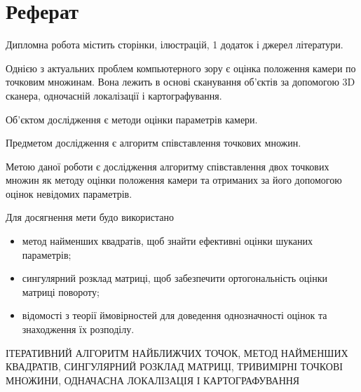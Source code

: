\chapter*{Реферат}

Дипломна робота містить \pageref{LastPage} сторінки,
 ілюстрацій, 1 додаток і
 джерел літератури.

Однією з актуальних проблем компьютерного зору є оцінка положення камери по
точковим множинам.
Вона лежить в основі сканування об'єктів за допомогою 3D сканера,
одночасній локалізації і картографування.

Об'єктом дослідження є методи оцінки параметрів камери.

Предметом дослідження є алгоритм співставлення точкових множин.

Метою даної роботи є дослідження алгоритму співставлення
двох точкових множин як методу оцінки положення камери та отриманих за його
допомогою оцінок невідомих параметрів.

Для досягнення мети будо використано
\begin{itemize}
  \item метод найменших квадратів, щоб знайти ефективні оцінки шуканих
  параметрів;
  \item сингулярний розклад матриці, щоб забезпечити ортогональність оцінки
  матриці повороту;
  \item відомості з теорії ймовірностей для доведення однозначності оцінок та
  знаходження їх розподілу.
\end{itemize}

\MakeUppercase{ітеративний алгоритм найближчих точок, метод найменших квадратів,
сингулярний розклад матриці, тривимірні точкові множини,
одначасна локалізація і картографування}

